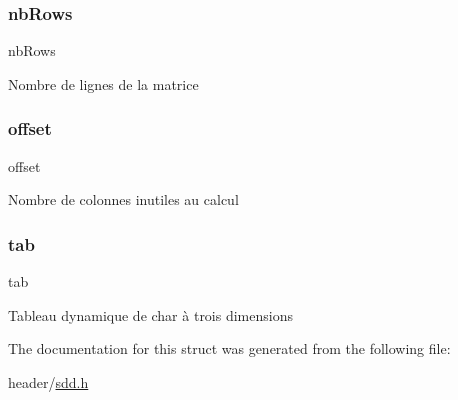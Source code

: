 \subsubsection{\texorpdfstring{nb\+Rows}{nbRows}}
{\footnotesize\ttfamily nb\+Rows}

Nombre de lignes de la matrice \mbox{\label{structdyn__mat__str_a7a229a4786deeddd59c6091247a8c8a6}} 
\subsubsection{\texorpdfstring{offset}{offset}}
{\footnotesize\ttfamily offset}

Nombre de colonnes inutiles au calcul \mbox{\label{structdyn__mat__str_af1ffd7c07d3cf727dfbec1ee327606fa}} 
\subsubsection{\texorpdfstring{tab}{tab}}
{\footnotesize\ttfamily tab}

Tableau dynamique de char à trois dimensions 

The documentation for this struct was generated from the following file\+:\begin{DoxyCompactItemize}
\item 
header/\hyperlink{sdd_8h}{sdd.\+h}\end{DoxyCompactItemize}
